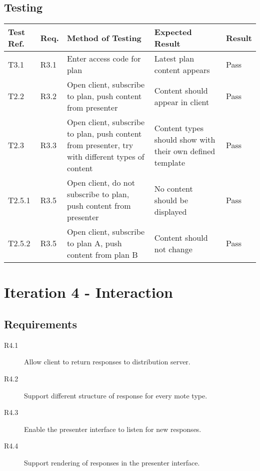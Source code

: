 \documentclass[a4papert,11pt,notitlepage]{article}
\begin{document}
\subsection{Testing}
\begin{tabular}{p{30pt} | p{25pt} | p{140pt} | p{140pt} || p{90pt}}
Test Ref. & Req. & Method of Testing & Expected Result & Result \\ \hline
T3.1 & R3.1 & Enter access code for plan & Latest plan content appears & Pass \\
T2.2 & R3.2 & Open client, subscribe to plan, push content from presenter & Content should appear in client & Pass \\
T2.3 & R3.3 & Open client, subscribe to plan, push content from presenter, try with different types of content & Content types should show with their own defined template & Pass \\
T2.5.1 & R3.5 & Open client, do not subscribe to plan, push content from presenter & No content should be displayed & Pass \\
T2.5.2 & R3.5 & Open client, subscribe to plan A, push content from plan B & Content should not change & Pass \\
\end{tabular}

\section{Iteration 4 - Interaction}
\subsection{Requirements}
\begin{description}
\item[R4.1] Allow client to return responses to distribution server.
\item[R4.2] Support different structure of response for every mote type.
\item[R4.3] Enable the presenter interface to listen for new responses.
\item[R4.4] Support rendering of responses in the presenter interface.
\end{description}
\end{document}
